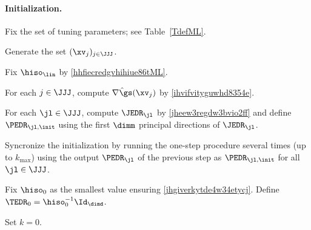 \paragraph{Initialization.}
\begin{mylist}

\item
Fix the set of tuning parameters; see Table~\ref{TdefML}.

\item
Generate the set \( (\xv_{j})_{j \in \JJJ} \).

\item
Fix \( \hiso_{\lin} \) by \eqref{hhfiecredgvhihiue86tML}.


\item
For each \( j \in \JJJ \), compute \( \hat{\nabla \gs}(\xv_{j}) \) by \eqref{ihvifvityguwhd8354e}.

\item 
For each \( \jl \in \JJJ \), compute \( \JEDR_{\jl} \) by \eqref{jheew3regdw3bvio2ff}
and define \( \PEDR_{\jl,\init} \) 
using the first \( \dimm \) principal directions of \( \JEDR_{\jl} \).

\item
Syncronize the initialization by 
running the one-step procedure several times (up to \( k_{\max} \)) 
using the output \( \PEDR_{\jl} \)
of the previous step as \( \PEDR_{\jl,\init} \) for all \( \jl \in \JJJ \).

\item
Fix \( \hiso_{0} \) as the smallest value ensuring \eqref{jhgiverkytde4w34etycj}.
Define \( \TEDR_{0} = \hiso_{0}^{-1} \Id_{\dimd} \).

\item Set \( k=0 \).

\end{mylist}


